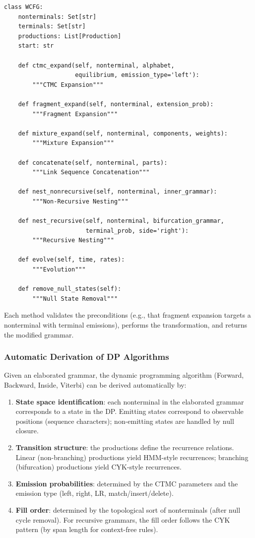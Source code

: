 \begin{verbatim}
class WCFG:
    nonterminals: Set[str]
    terminals: Set[str]
    productions: List[Production]
    start: str

    def ctmc_expand(self, nonterminal, alphabet,
                    equilibrium, emission_type='left'):
        """CTMC Expansion"""

    def fragment_expand(self, nonterminal, extension_prob):
        """Fragment Expansion"""

    def mixture_expand(self, nonterminal, components, weights):
        """Mixture Expansion"""

    def concatenate(self, nonterminal, parts):
        """Link Sequence Concatenation"""

    def nest_nonrecursive(self, nonterminal, inner_grammar):
        """Non-Recursive Nesting"""

    def nest_recursive(self, nonterminal, bifurcation_grammar,
                       terminal_prob, side='right'):
        """Recursive Nesting"""

    def evolve(self, time, rates):
        """Evolution"""

    def remove_null_states(self):
        """Null State Removal"""
\end{verbatim}

Each method validates the preconditions (e.g., that fragment
expansion targets a nonterminal with terminal emissions),
performs the transformation, and returns the modified grammar.

\subsubsection{Automatic Derivation of DP Algorithms}

Given an elaborated grammar, the dynamic programming algorithm
(Forward, Backward, Inside, Viterbi) can be derived automatically
by:

\begin{enumerate}
\item \textbf{State space identification}: each nonterminal in the
  elaborated grammar corresponds to a state in the DP.
  Emitting states correspond to observable positions (sequence characters);
  non-emitting states are handled by null closure.

\item \textbf{Transition structure}: the productions define
  the recurrence relations.  Linear (non-branching) productions
  yield HMM-style recurrences; branching (bifurcation) productions
  yield CYK-style recurrences.

\item \textbf{Emission probabilities}: determined by the CTMC
  parameters and the emission type (left, right, LR, match/insert/delete).

\item \textbf{Fill order}: determined by the topological sort of
  nonterminals (after null cycle removal).
  For recursive grammars, the fill order follows the CYK pattern
  (by span length for context-free rules).
\end{enumerate}

